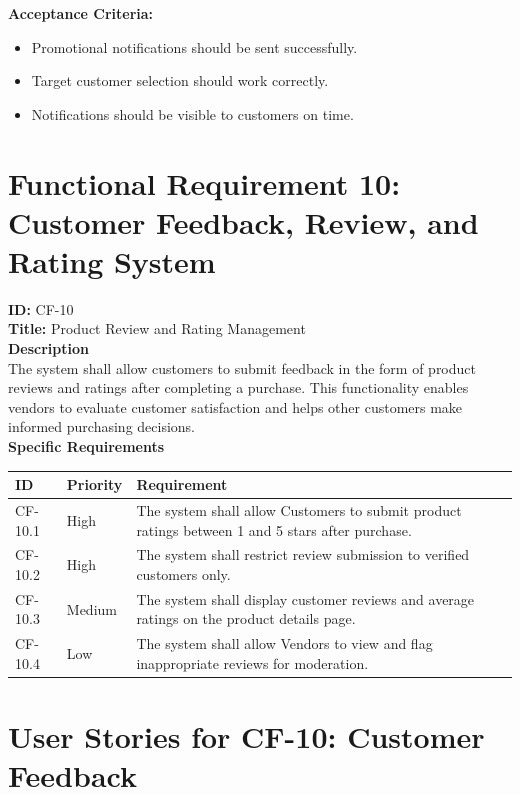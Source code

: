 \noindent\textbf{Acceptance Criteria:}
\begin{itemize}
    \item Promotional notifications should be sent successfully.
    \item Target customer selection should work correctly.
    \item Notifications should be visible to customers on time.
\end{itemize}


\section{Functional Requirement 10: Customer Feedback, Review, and Rating System
}

\textbf{ID:} CF-10 \\
\textbf{Title:} Product Review and Rating Management
\\
\textbf{Description}\\
The system shall allow customers to submit feedback in the form of product reviews and ratings after completing a purchase. This functionality enables vendors to evaluate customer satisfaction and helps other customers make informed purchasing decisions.\\
\textbf{Specific Requirements}
\begin{table}[H]
\centering
\label{tab:customer-feedback}
\begin{tabular}{>{\raggedright\arraybackslash}p{2cm}>{\centering\arraybackslash}p{2cm}>{\raggedright\arraybackslash}p{10cm}}
\toprule
\textbf{ID} & \textbf{Priority} & \textbf{Requirement} \\
\midrule
CF-10.1 & High & The system shall allow Customers to submit product ratings between 1 and 5 stars after purchase. \\
\midrule
CF-10.2 & High & The system shall restrict review submission to verified customers only. \\
\midrule
CF-10.3 & Medium & The system shall display customer reviews and average ratings on the product details page. \\
\midrule
CF-10.4 & Low & The system shall allow Vendors to view and flag inappropriate reviews for moderation. \\
\bottomrule
\end{tabular}
\end{table}


\section*{User Stories for CF-10: Customer Feedback}

